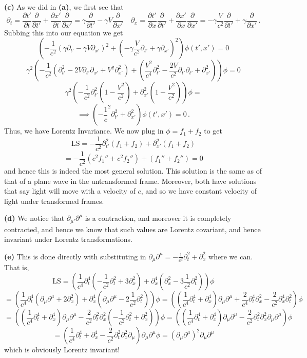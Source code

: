\documentclass[10pt]{article}
\newcommand{\di}[2][]{\frac{\partial #1}{\partial #2}}
\begin{document}
\textbf{(c)} As we did in \textbf{(a)}, we first see that
\[ \partial_{t} = \di[t']{t}\di{t'} + \di[x']{t}\di{x'} = \gamma\di{t'} -\gamma V\di{x'} \quad \partial_{x} = \di[t']{x}\di{t'} + \di[x']{x}\di{x'} = -\gamma\frac{V}{c^{2}}\di{t'} +\gamma \di{x'} \, .\]
Subbing this into our equation we get
\[ \left(-\frac{1}{c^{2}}\left(\gamma\partial_{t'} -\gamma V\partial_{x'}\right)^{2} + \left(-\gamma\frac{V}{c^{2}}\partial_{t'} +\gamma \partial_{x'}\right)^{2}\right)\phi(t',x') = 0\]
\[ \gamma^{2}\left(-\frac{1}{c^{2}}\left(\partial_{t'}^{2} - 2V\partial_{t'}\partial_{x'}+V^{2}\partial_{x'}^{2}\right) + \left(\frac{V^{2}}{c^{4}}\partial_{t'}^{2} - \frac{2V}{c^{2}}\partial_{t'}\partial_{t'} + \partial_{x'}^{2}\right)\right)\phi  = 0\]
\[ \gamma^{2}\left(-\frac{1}{c^{2}}\partial_{t'}^{2}\left(1 - \frac{V^{2}}{c^{2}}\right) + \partial_{x'}^{2}\left(1 - \frac{V^{2}}{c^{2}}\right)\right)\phi = \]
\[ \implies \left(-\frac{1}{c}^{2}\partial_{t'}^{2} + \partial_{x'}^{2}\right)\phi(t',x') = 0\, .\]
Thus, we have Lorentz Invariance. We now plug in $\phi = f_{1} + f_{2}$ to get
\[ \text{LS} = -\frac{1}{c^{2}}\partial_{t'}^{2}(f_{1} + f_{2}) + \partial_{x'}^{2}(f_{1} + f_{2}) \]
\[ = -\frac{1}{c^{2}}(c^{2}f_{1}'' + c^{2}f_{2}'') + (f_{1}'' + f_{2}'') = 0 \]
and hence this is indeed the most general solution. This solution is the same as of that of a plane wave in the untransformed frame. Moreover, both have solutions that say light will move with a velocity of $c$, and so we have constant velocity of light under transformed frames.

\textbf{(d)} We notice that $\partial_{\mu'}\partial^{\mu}$ is a contraction, and moreover it is completely contracted, and hence we know that such values are Lorentz covariant, and hence invariant under Lorentz transformations.

\textbf{(e)} This is done directly with substituting in $\partial_{\mu}\partial^{\mu} = -\frac{1}{c^{2}}\partial_{t}^{2} + \partial_{x}^{2}$ where we can. That is,
\[ \text{LS} = \left(\frac{1}{c^{4}}\partial_{t}^{4}\left(-\frac{1}{c^{2}}\partial_{t}^{2}+3\partial_{x}^{2}\right) + \partial_{x}^{4}\left(\partial_{x}^{2} - 3\frac{1}{c^{2}}\partial_{t}^{2}\right)\right)\phi \]
\[ = \left(\frac{1}{c^{4}}\partial_{t}^{4}\left(\partial_{\mu}\partial^{\mu} + 2\partial_{x}^{2}\right) + \partial_{x}^{4}\left(\partial_{\mu}\partial^{\mu} - 2\frac{1}{c^{2}}\partial_{t}^{2}\right)\right)\phi = \left(\left(\frac{1}{c^{4}}\partial_{t}^{4} + \partial_{x}^{4}\right)\partial_{\mu}\partial^{\mu} + \frac{2}{c^{4}}\partial_{t}^{4}\partial_{x}^{2} - \frac{2}{c^{2}}\partial_{x}^{4}\partial_{t}^{2}\right)\phi \]
\[ =\left(\left(\frac{1}{c^{4}}\partial_{t}^{4} + \partial_{x}^{4}\right)\partial_{\mu}\partial^{\mu} - \frac{2}{c^{2}}\partial_{t}^{2}\partial_{x}^{2}\left(-\frac{1}{c^{2}}\partial_{t}^{2} + \partial_{x}^{2}\right)\right)\phi = \left(\left(\frac{1}{c^{4}}\partial_{t}^{4} + \partial_{x}^{4}\right)\partial_{\mu}\partial^{\mu} - \frac{2}{c^{2}}\partial_{t}^{2}\partial_{x}^{2}\partial_{\mu}\partial^{\mu}\right)\phi\]
\[ = \left(\frac{1}{c^{4}}\partial_{t}^{4} + \partial_{x}^{4} - \frac{2}{c^{2}}\partial_{t}^{2}\partial_{x}^{2}\partial_{\mu}\right)\partial_{\mu}\partial^{\mu}\phi = (\partial_{\mu}\partial^{\mu})^{2}\partial_{\mu}\partial^{\mu}\]
which is obviously Lorentz invariant!
\end{document}
